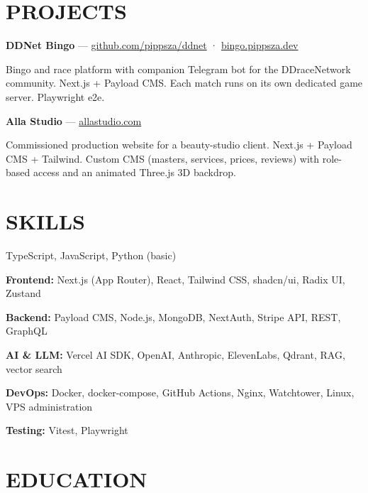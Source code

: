 \documentclass[10pt,a4paper]{article}
\begin{document}
\section*{PROJECTS}

{\bfseries DDNet Bingo} — \href{https://github.com/pippsza/ddnet}{github.com/pippsza/ddnet} · \href{https://bingo.pippsza.dev}{bingo.pippsza.dev}\par
Bingo and race platform with companion Telegram bot for the DDraceNetwork community. Next.js + Payload CMS. Each match runs on its own dedicated game server. Playwright e2e.

\vspace{5pt}
{\bfseries Alla Studio} — \href{https://allastudio.com}{allastudio.com}\par
Commissioned production website for a beauty-studio client. Next.js + Payload CMS + Tailwind. Custom CMS (masters, services, prices, reviews) with role-based access and an animated Three.js 3D backdrop.

\section*{SKILLS}

 TypeScript, JavaScript, Python (basic)\par
{\bfseries Frontend:} Next.js (App Router), React, Tailwind CSS, shadcn/ui, Radix UI, Zustand\par
{\bfseries Backend:} Payload CMS, Node.js, MongoDB, NextAuth, Stripe API, REST, GraphQL\par
{\bfseries AI \& LLM:} Vercel AI SDK, OpenAI, Anthropic, ElevenLabs, Qdrant, RAG, vector search\par
{\bfseries DevOps:} Docker, docker-compose, GitHub Actions, Nginx, Watchtower, Linux, VPS administration\par
{\bfseries Testing:} Vitest, Playwright

\section*{EDUCATION}
\end{document}
